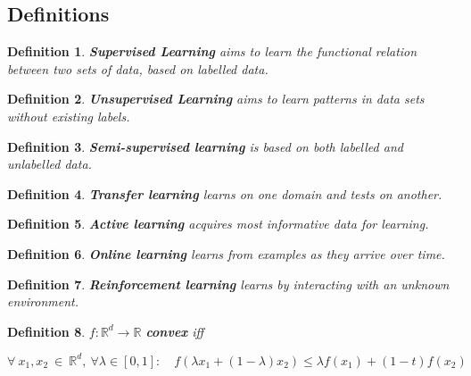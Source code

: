 \documentclass[8pt,a4paper]{scrartcl}
\newtheorem{define}{Definition}
\begin{document}
\begin{multicols*}{3}
\setcounter{section}{-1}
\section{Definitions}

\begin{define}
\textbf{Supervised Learning} aims to learn the functional relation between two sets of data, based on labelled data.
\end{define}

\begin{define}
\textbf{Unsupervised Learning} aims to learn patterns in data sets without existing labels.
\end{define}

\begin{define}
\textbf{Semi-supervised learning} is based on both labelled and unlabelled data.
\end{define}

\begin{define}
\textbf{Transfer learning} learns on one domain and tests on another.
\end{define}

\begin{define}
\textbf{Active learning} acquires most informative data for learning.
\end{define}

\begin{define}
\textbf{Online learning} learns from examples as they arrive over time.
\end{define}

\begin{define}
\textbf{Reinforcement learning} learns by interacting with an unknown environment.
\end{define}

\begin{define}
$f:\mathbb{R}^d\rightarrow\mathbb{R}$ \textbf{convex} iff

$\forall\ x_1,x_2\ \in\ \mathbb{R}^d,\ \forall \lambda\in[0,1]:\quad f(\lambda x_1+(1-\lambda)x_2)\leq \lambda f(x_1)+(1-t)f(x_2)$
\end{define}


\end{multicols*}
\end{document}
